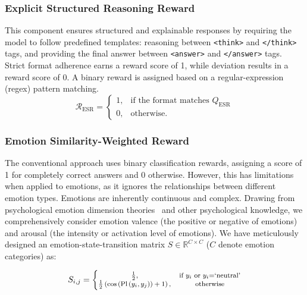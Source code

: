 \documentclass[11pt]{article}
\begin{document}
\subsubsection{Explicit Structured Reasoning Reward}
This component ensures structured and explainable responses by requiring the model to follow predefined templates: reasoning between \texttt{<think>} and \texttt{</think>} tags, and providing the final answer between \texttt{<answer>} and \texttt{</answer>} tags. Strict format adherence earns a reward score of 1, while deviation results in a reward score of 0. A binary reward is assigned based on a regular-expression (regex) pattern matching.
\begin{equation}
	\mathcal{R}_{\mathrm{ESR}}=\begin{cases}1,&\text{if the format matches $Q_{\text{ESR}}$}   \\ 0, &\mathrm{otherwise.}\end{cases}
\end{equation}
\subsubsection{Emotion Similarity-Weighted Reward}
The conventional approach uses binary classification rewards, assigning a score of 1 for completely correct answers and 0 otherwise. However, this has limitations when applied to emotions, as it ignores the relationships between different emotion types. Emotions are inherently continuous and complex. Drawing from psychological emotion dimension theories~\cite{plutchik1982psychoevolutionary} and other psychological knowledge, we comprehensively consider emotion valence (the positive or negative of emotions) and arousal (the intensity or activation level of emotions). We have meticulously designed an emotion-state-transition matrix $S \in \mathbb{R}^{C \times C}$ ($C$ denote emotion categories) as:

\begin{equation}
	\begin{footnotesize}
		S_{i,j}=\left\{ \begin{matrix}
			\frac{1}{2},                                                                       & \text{if $y_i$ or $y_i$=`$\mathrm{neutral}$'} \\
			\frac{1}{2}\left( \cos \left( \text{Pl}\left( y_i,y_j \right) \right) +1 \right) , & \mathrm{otherwise}                            \\
		\end{matrix} \right.
	\end{footnotesize}
\end{equation}
\end{document}
